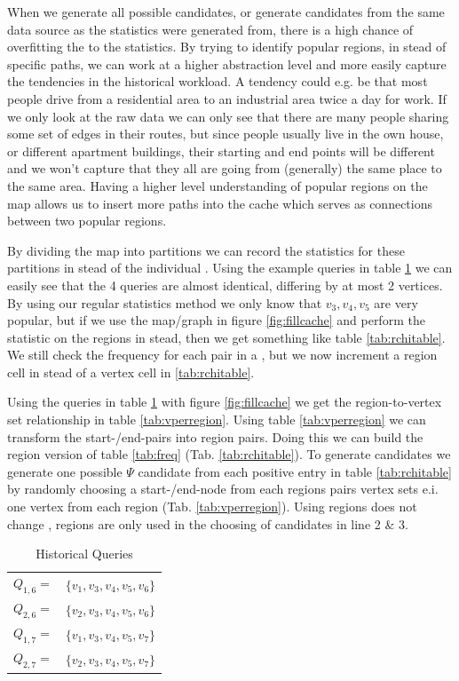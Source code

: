 When we generate all possible \spath candidates, or generate \spath candidates from the same data source as the statistics were generated from, there is a high chance of overfitting the \spaths to the statistics. By trying to identify popular regions, in stead of specific paths, we can work at a higher abstraction level and more easily capture the tendencies in the historical workload. A tendency could e.g. be that most people drive from a residential area to an industrial area twice a day for work. If we only look at the raw data we can only see that there are many people sharing some set of edges in their routes, but since people usually live in the own house, or different apartment buildings, their starting and end points will be different and we won't capture that they all are going from (generally) the same place to the same area. Having a higher level understanding of popular regions on the map allows us to insert more paths into the cache which serves as connections between two popular regions.

By dividing the map into partitions we can record the statistics for these partitions in stead of the individual \spathsns. Using the example queries in table \ref{tab:queries2} we can easily see that the 4 queries are almost identical, differing by at most 2 vertices. By using our regular statistics method we only know that $v_3,v_4,v_5$ are very popular, but if we use the map/graph in figure \ref{fig:fillcache} and perform the statistic on the regions in stead, then we get something like table \ref{tab:rchitable}. We still check the frequency for each pair in a 
\spathns, but we now increment a region cell in stead of a vertex cell in \ref{tab:rchitable}.

Using the queries in table \ref{tab:queries2} with figure \ref{fig:fillcache} we get the region-to-vertex set relationship in table \ref{tab:vperregion}. Using table \ref{tab:vperregion} we can transform the start-/end-pairs into region pairs. Doing this we can build the region version of table \ref{tab:freq} (Tab. \ref{tab:rchitable}). To generate candidates we generate one possible $\Psi$ candidate from each positive entry in table \ref{tab:rchitable} by randomly choosing a start-/end-node from each regions pairs vertex sets e.i. one vertex from each region (Tab. \ref{tab:vperregion}).
Using regions does not change \salgons, regions are only used in the choosing of candidates in line 2 \& 3.



\begin{table}
\center
\begin{tabular}{l l}
$Q_{1,6} =$ 	& $\{v_1,v_3,v_4,v_5,v_6\}$\\
$Q_{2,6} =$ 	& $\{v_2,v_3,v_4,v_5,v_6\}$ \\
$Q_{1,7} =$ 	& $\{v_1,v_3,v_4,v_5,v_7\}$ \\
$Q_{2,7} =$ 	& $\{v_2,v_3,v_4,v_5,v_7\}$ \\
\end{tabular}
\caption{Historical Queries}
\label{tab:queries2}
\end{table}

